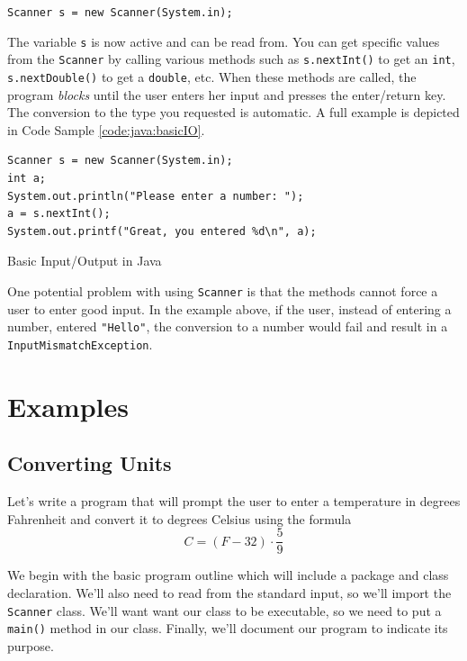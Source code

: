 \texttt{Scanner s = new Scanner(System.in);}

The variable \texttt{s} is now active and can be read from.  You can get specific
values from the \texttt{Scanner} by calling various methods such as \texttt{s.nextInt()}
to get an \texttt{int}, \texttt{s.nextDouble()} to get a \texttt{double}, etc.
When these methods are called, the program \emph{blocks} until the user enters her input
and presses the enter/return key.  The conversion to the type you requested is automatic.
A full example is depicted in Code Sample \ref{code:java:basicIO}.

\begin{listing}
\begin{verbatim}
Scanner s = new Scanner(System.in);
int a;
System.out.println("Please enter a number: ");
a = s.nextInt();
System.out.printf("Great, you entered %d\n", a);
\end{verbatim}
\caption{Basic Input/Output in Java}
\label{code:java:basicIO}
\end{listing}

One potential problem with using \texttt{Scanner} is that the 
methods cannot force a user to enter good input.  In the example above,
if the user, instead of entering a number, entered \texttt{"Hello"}, 
the conversion to a number would fail and result in a 
\texttt{InputMismatchException}.

\section{Examples}

\subsection{Converting Units}

Let's write a program that will prompt 
the user to enter a temperature in degrees Fahrenheit and convert 
it to degrees Celsius using the formula
  $$C = (F - 32) \cdot \frac{5}{9}$$

We begin with the basic program outline which will include a package and
class declaration.  We'll also need
to read from the standard input, so we'll import the \texttt{Scanner}
class.  We'll want want our class to be executable, so we need to 
put a \texttt{main()} method in our class.  Finally, we'll document
our program to indicate its purpose.


